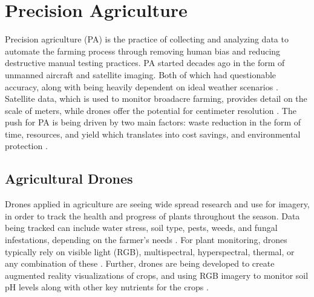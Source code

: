 \documentclass{IEEEtran}
\begin{document}

\section{Precision Agriculture}
Precision agriculture (PA) is the practice of collecting and analyzing data to automate the farming process through removing human bias and reducing destructive manual testing practices. PA started decades ago
in the form of unmanned aircraft and satellite imaging. Both of which had questionable accuracy, along with being heavily dependent on ideal weather scenarios \cite{key9}. Satellite data, which is used
to monitor broadacre farming, provides detail on the scale of meters, while drones offer the potential for centimeter resolution \cite{key8}. The push for PA is being driven by two main factors: waste reduction in the form
of time, resources, and yield which translates into cost savings, and environmental protection \cite{key9}.

\subsection{Agricultural Drones}
Drones applied in agriculture are seeing wide spread research and use for imagery, in order to track the health and progress of plants throughout the season.
Data being tracked can include water stress, soil type, pests, weeds, and fungal infestations, depending on the farmer’s needs \cite{key9}. For plant monitoring,
drones typically rely on visible light (RGB), multispectral, hyperspectral, thermal, or any combination of these \cite{key7} \cite{key8} \cite{key9}. Further,
drones are being developed to create augmented reality visualizations of crops, and using RGB imagery to monitor soil pH levels along with other key nutrients
for the crops \cite{key7}.
\end{document}
